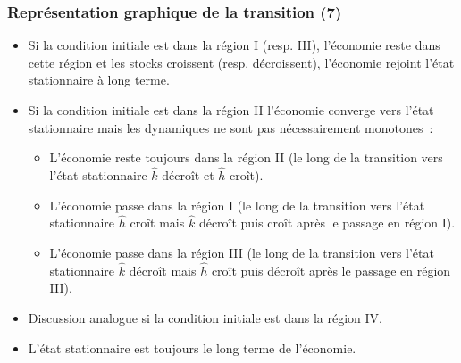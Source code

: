 \documentclass[10pt,notheorems]{beamer}
\theoremstyle{plain}
\theoremstyle{definition} %
\begin{document}
\begin{frame}
  \frametitle{Représentation graphique de la transition (7)}

  \begin{itemize}

  \item Si la condition initiale est dans la région I (resp. III), l'économie reste dans cette région et les stocks croissent (resp. décroissent), l'économie rejoint l'état stationnaire à long terme.\newline

  \item Si la condition initiale est dans la région II l'économie converge vers l'état stationnaire mais les dynamiques ne sont pas nécessairement monotones~:
    \begin{itemize}
    \item L'économie reste toujours dans la région II (le long de la transition vers l'état stationnaire $\hat k$ décroît et $\hat h$ croît).
    \item L'économie passe dans la région I (le long de la transition vers l'état stationnaire $\hat h$ croît mais $\hat k$ décroît puis croît après le passage en région I).
    \item L'économie passe dans la région III (le long de la transition vers l'état stationnaire $\hat k$ décroît mais $\hat h$ croît puis décroît après le passage en région III).\newline
    \end{itemize}

  \item Discussion analogue si la condition initiale est dans la région IV.\newline

  \item L'état stationnaire est toujours le long terme de l'économie.
  \end{itemize}

\end{frame}
\end{document}
